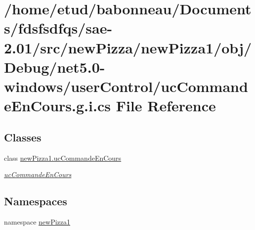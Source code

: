 \hypertarget{net5_80-windows_2userControl_2ucCommandeEnCours_8g_8i_8cs}{}\section{/home/etud/babonneau/\+Documents/fdsfsdfqs/sae-\/2.01/src/new\+Pizza/new\+Pizza1/obj/\+Debug/net5.0-\/windows/user\+Control/uc\+Commande\+En\+Cours.g.\+i.\+cs File Reference}
\label{net5_80-windows_2userControl_2ucCommandeEnCours_8g_8i_8cs}
\subsection*{Classes}
\begin{DoxyCompactItemize}
\item 
class \hyperlink{classnewPizza1_1_1ucCommandeEnCours}{new\+Pizza1.\+uc\+Commande\+En\+Cours}
\begin{DoxyCompactList}\small\item\em \hyperlink{classnewPizza1_1_1ucCommandeEnCours}{uc\+Commande\+En\+Cours} \end{DoxyCompactList}\end{DoxyCompactItemize}
\subsection*{Namespaces}
\begin{DoxyCompactItemize}
\item 
namespace \hyperlink{namespacenewPizza1}{new\+Pizza1}
\end{DoxyCompactItemize}
